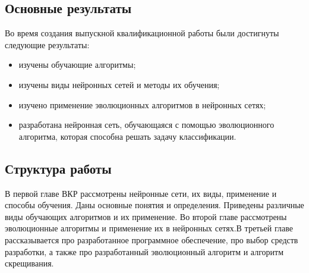 \subsection*{Основные результаты}

\indent \indent Во время создания выпускной квалификационной работы были достигнуты следующие результаты:
\begin{itemize}
	\item изучены обучающие алгоритмы;
	\item изучены виды нейронных сетей и методы их обучения;
	\item изучено применение эволюционных алгоритмов в нейронных сетях;
	\item разработана нейронная сеть, обучающаяся с помощью эволюционного алгоритма, которая способна решать задачу классификации.
\end{itemize}

\subsection*{Структура работы}

\indent \indent В первой главе ВКР рассмотрены нейронные сети, их виды, применение и способы обучения. Даны основные понятия и определения. Приведены различные виды обучающих алгоритмов и их применение. Во второй главе рассмотрены эволюционные алгоритмы и применение их в нейронных сетях.В третьей главе рассказывается про разработанное программное обеспечение, про выбор средств разработки, а также про разработанный эволюционный алгоритм и алгоритм скрещивания.
